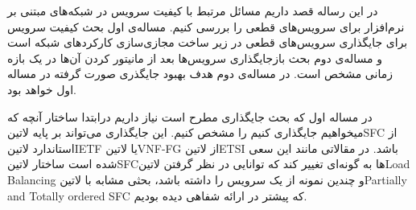 \documentclass{article}
\begin{document}
در این رساله قصد داریم مسائل مرتبط با کیفیت سرویس در شبکه‌های مبتنی بر نرم‌افزار برای سرویس‌های قطعی را بررسی کنیم.
مساله‌ی اول بحث کیفیت سرویس برای جایگذاری سرویس‌های قطعی در زیر ساخت مجازی‌سازی کارکردهای شبکه است و مساله‌ی دوم بحث بازجایگذاری سرویس‌ها بعد از مانیتور کردن آن‌ها در یک بازه زمانی مشخص است.
در مساله‌ی دوم هدف بهبود جایگذری صورت گرفته در مساله اول خواهد بود.

در مساله اول که بحث جایگذاری مطرح است نیاز داریم درابتدا ساختار آنچه که میخواهیم جایگذاری کنیم را مشخص کنیم. این جایگذاری می‌تواند بر پایه ‌لاتین{SFC} از استاندارد ‌لاتین{IETF} یا ‌لاتین{VNF-FG} از ‌لاتین{ETSI} باشد.
در مقالاتی مانند این سعی شده است ساختار ‌لاتین{SFC}ها به گونه‌ای تغییر کند که توانایی در نظر گرفتن ‌لاتین{Load Balancing} و چندین نمونه از یک سرویس را داشته باشد، بحثی مشابه با ‌لاتین{Partially and Totally ordered SFC} که پیشتر در ارائه شفاهی دیده بودیم.
\end{document}
